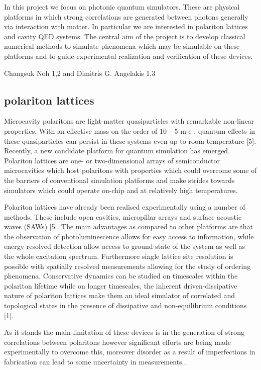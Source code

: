 \documentclass[10pt,twocolumn]{article}
\begin{document}
In this project we focus on photonic quantum simulators. These are physical platforms in which strong correlations are generated between photons generally via interaction with matter. In particular we are interested in polariton lattices and cavity QED systems. The central aim of the project is to develop classical numerical methods to simulate phenomena which may be simulable on these platforms and to guide experimental realization and verification of these devices.

Changsuk Noh 1,2 and Dimitris G. Angelakis 1,3

\subsection{polariton lattices}
Microcavity polaritons are light-matter quasiparticles with remarkable non-linear properties. With an effective mass on the order of 10 −5 m e , quantum effects in these quasiparticles can persist in these systems even up to room temperature [5]. Recently, a new candidate platform for quantum simulation has emerged. Polariton lattices are one- or two-dimensional arrays of semiconductor microcavities which host polaritons with properties which could overcome some of the barriers of conventional simulation platforms and make strides towards simulators which could operate on-chip and at relatively high temperatures.

Polariton lattices have already been realised experimentally using a number of methods. These include open cavities, micropillar arrays and surface acoustic waves (SAWs) [5]. The main advantages as compared to other platforms are that the observation of photoluminescence allows for easy access to information, while energy resolved detection allow access to ground state of the system as well as the whole excitation spectrum. Furthermore single lattice site resolution is possible with spatially resolved measurements allowing for the study of ordering phenomena. Conservative dynamics can be studied on timescales within the polariton lifetime while on longer timescales, the inherent driven-dissipative nature of polariton lattices make them an ideal simulator of correlated and topological states in the presence of dissipative and non-equilibrium conditions [1].

As it stands the main limitation of these devices is in the generation of strong correlations between polaritons however significant efforts are being made experimentally to overcome this, moreover disorder as a result of imperfections in fabrication can lead to some uncertainty in measurements...
 
\end{document}
